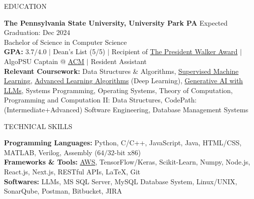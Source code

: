 \documentclass{resume} %
\begin{document}

\begin{rSection}{EDUCATION}

{\bf The Pennsylvania State University, University Park PA} \hfill {Expected Graduation: Dec $2024$}\\
{Bachelor of Science in Computer Science}\\
{\bf GPA:} $3.7/4.0$ $\vert$ Dean's List (5/5) $\vert$ Recipient of \href{https://awardsrecognition.psu.edu/student/undergraduate-scholastic-awards/}{The President Walker Award} $\vert$ AlgoPSU Captain @ \href{https://acm.psu.edu/algopsu/}{ACM} $\vert$ Resident Assistant\\
{\bf Relevant Coursework:} Data Structures \& Algorithms, \href{https://www.coursera.org/account/accomplishments/verify/JYX5UB5YP4YD}{Supervised Machine Learning}, \href{https://www.coursera.org/account/accomplishments/records/PBF4QN2KQL4Z}{Advanced Learning Algorithms} (Deep Learning), \href{https://www.coursera.org/account/accomplishments/verify/3W6HA4ZC7UTY}{Generative AI with LLMs}, Systems Programming, Operating Systems, Theory of Computation, Programming and Computation II: Data Structures, CodePath: (Intermediate+Advanced) Software Engineering, Database Management Systems
\end{rSection}


\begin{rSection}{TECHNICAL SKILLS}

{\bf Programming Languages:} Python, C/C++, JavaScript, Java, HTML/CSS, MATLAB, Verilog, Assembly ($64/32$-bit x$86$)\\
{\bf Frameworks \& Tools:} \href{https://www.coursera.org/account/accomplishments/verify/7L8L8YQTMCPZ}{AWS}, TensorFlow/Keras, Scikit-Learn, Numpy, Node.js, React.js, Next.js, RESTful APIs, \LaTeX, Git\\
{\bf Softwares:} LLMs, MS SQL Server, MySQL Database System, Linux/UNIX, SonarQube, Postman, Bitbucket, JIRA

\end{rSection}
\end{document}
